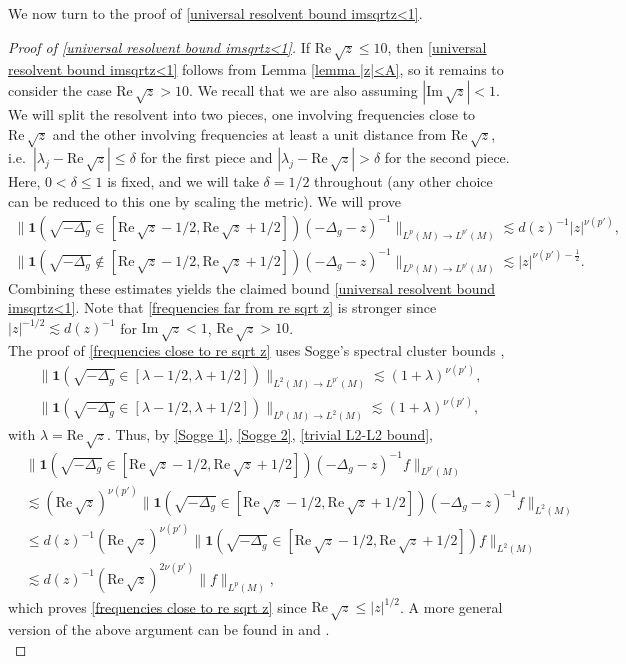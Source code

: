 \documentclass[12pt]{amsart}
\newcommand\re{\mathrm{Re}\,}
\newcommand\im{\mathrm{Im}\,}
\begin{document}
 We now turn to the proof of \eqref{universal resolvent bound imsqrtz<1}.

\begin{proof}[Proof of \eqref{universal resolvent bound imsqrtz<1}] If $\re \sqrt{z}\leq 10$, then \eqref{universal resolvent bound imsqrtz<1} follows from Lemma \ref{lemma |z|<A}, so it remains to consider the case $\re\sqrt{z}>10$. 
We recall that we are also assuming $|\im\sqrt{z}|<1$.
We will split the resolvent into two pieces, one involving frequencies close to $\re\sqrt{z}$ and the other involving frequencies at least a unit distance from $\re\sqrt{z}$, i.e.\ $|\lambda_j-\re\sqrt{z}|\leq \delta$ for the first piece and $|\lambda_j-\re\sqrt{z}|> \delta$ for the second piece. Here, $0<\delta\leq 1$ is fixed, and we will take $\delta=1/2$ throughout (any other choice can be reduced to this one by scaling the metric). 
We will prove 
\begin{align}
\|\mathbf{1}(\sqrt{-\Delta_g}\in [\re\sqrt{z}-1/2,\re\sqrt{z}+1/2])(-\Delta_g-z)^{-1}\|_{L^{p}(M)\to L^{p'}(M)}\lesssim d(z)^{-1}|z|^{\nu(p')},\label{frequencies close to re sqrt z}\\
\|\mathbf{1}(\sqrt{-\Delta_g}\notin [\re\sqrt{z}-1/2,\re\sqrt{z}+1/2])(-\Delta_g-z)^{-1}\|_{L^{p}(M)\to L^{p'}(M)}\lesssim|z|^{\nu(p')-\frac{1}{2}}.\label{frequencies far from re sqrt z}
\end{align}
Combining these estimates yields the claimed bound \eqref{universal resolvent bound imsqrtz<1}. Note that \eqref{frequencies far from re sqrt z} is stronger since $|z|^{-1/2}\lesssim d(z)^{-1}$ for $\im\sqrt{z}<1$, $\re\sqrt{z}>10$.\\

The proof of \eqref{frequencies close to re sqrt z} uses Sogge's spectral cluster bounds \cite{MR930395},
\begin{align}
\|\mathbf{1}(\sqrt{-\Delta_g}\in [\lambda-1/2,\lambda+1/2])\|_{L^{2}(M)\to L^{p'}(M)}\lesssim(1+\lambda)^{\nu(p')},\label{Sogge 1}\\
\|\mathbf{1}(\sqrt{-\Delta_g}\in [\lambda-1/2,\lambda+1/2])\|_{L^{p}(M)\to L^{2}(M)}\lesssim(1+\lambda)^{\nu(p')},\label{Sogge 2}
\end{align}
with $\lambda=\re\sqrt{z}$.
Thus, by \eqref{Sogge 1}, \eqref{Sogge 2}, \eqref{trivial L2-L2 bound},
\begin{align}\label{proof of frequencies close to re sqrt z}
 &\|\mathbf{1}(\sqrt{-\Delta_g}\in [\re\sqrt{z}-1/2,\re\sqrt{z}+1/2])(-\Delta_g-z)^{-1}f\|_{L^{p'}(M)}\\
 &\lesssim (\re\sqrt{z})^{\nu(p')}\|\mathbf{1}(\sqrt{-\Delta_g}\in [\re\sqrt{z}-1/2,\re\sqrt{z}+1/2])(-\Delta_g-z)^{-1}f\|_{L^{2}(M)}\\
 &\leq d(z)^{-1} (\re\sqrt{z})^{\nu(p')}\|\mathbf{1}(\sqrt{-\Delta_g}\in [\re\sqrt{z}-1/2,\re\sqrt{z}+1/2])f\|_{L^{2}(M)}\\
 &\lesssim  d(z)^{-1}(\re\sqrt{z})^{2\nu(p')}\|f\|_{L^{p}(M)},
\end{align}
which proves \eqref{frequencies close to re sqrt z} since $\re\sqrt{z}\leq |z|^{1/2}$. A more general version of the above argument can be found in \cite[Lemma 2.3]{MR3302640} and \cite[Lemma 3.1]{MR4664427}.\\


\end{proof}
\end{document}
